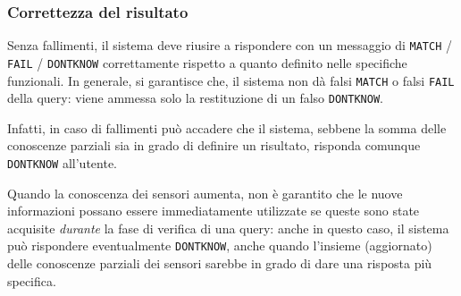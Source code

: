 \documentclass{llncs}
\begin{document}
\subsubsection*{Correttezza del risultato}
Senza fallimenti, il sistema deve riusire a rispondere con un messaggio di
\texttt{MATCH} / \texttt{FAIL} / \texttt{DONTKNOW} correttamente
rispetto a quanto definito nelle specifiche funzionali.
In generale, si garantisce che,
il sistema non dà falsi \texttt{MATCH} o falsi \texttt{FAIL} della query:
viene ammessa solo la restituzione di un falso \texttt{DONTKNOW}.

Infatti,
in caso di fallimenti può accadere che il sistema, sebbene la somma
delle conoscenze parziali sia in grado di definire un risultato,
risponda comunque \texttt{DONTKNOW} all'utente.

Quando la conoscenza dei sensori aumenta,
non è garantito che le nuove informazioni possano essere immediatamente
utilizzate se queste sono state acquisite \emph{durante} la fase di verifica
di una query: anche in questo caso, il sistema può rispondere eventualmente
\texttt{DONTKNOW}, anche quando l'insieme (aggiornato) delle conoscenze parziali
dei sensori sarebbe in grado di dare una risposta più specifica.

\end{document}
